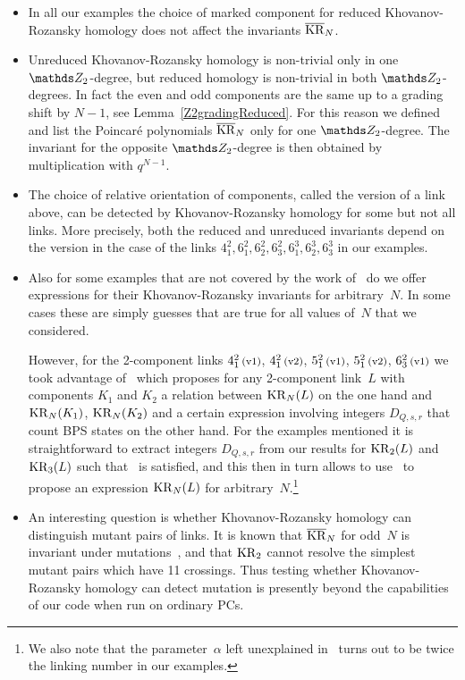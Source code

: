 \documentclass{compositio}
\theoremstyle{definition}
\numberwithin{equation}{section}
\begin{document}
\begin{itemize}
\item 
In all our examples the choice of marked component for reduced Khovanov-Rozansky homology does not affect the invariants $\overline{\operatorname{KR}}_{N}$. 
\item 
Unreduced Khovanov-Rozansky homology is non-trivial only in one $\nZ_{2}$-degree, but reduced homology is non-trivial in both $\nZ_{2}$-degrees. In fact the even and odd components are the same up to a grading shift by $N-1$, see Lemma~\ref{Z2gradingReduced}. For this reason we defined and list the Poincar\'e polynomials $\overline{\operatorname{KR}}_{N}$ only for one $\nZ_{2}$-degree. The invariant for the opposite $\nZ_{2}$-degree is then obtained by multiplication with $q^{N-1}$. 
\item 
The choice of relative orientation of components, called the version of a link above, can be detected by Khovanov-Rozansky homology for some but not all links. More precisely, both the reduced and unreduced invariants depend on the version in the case of the links $4_{1}^2, 6_{1}^2, 6_{2}^2, 6_{3}^2, 6_{1}^3, 6_{2}^3, 6_{3}^3$ in our examples. 
\item 
Also for some examples that are not covered by the work of~\cite{r0508510, r0607544} do we offer expressions for their Khovanov-Rozansky invariants for arbitrary~$N$. In some cases these are simply guesses that are true for all values of~$N$ that we considered. 

However, for the 2-component links $4_{1}^2\,\text{{\footnotesize (v1)}}$, $4_{1}^2\,\text{{\footnotesize (v2)}}$, $5_{1}^2\,\text{{\footnotesize (v1)}}$, $5_{1}^2\,\text{{\footnotesize (v2)}}$, $6_{3}^2\,\text{{\footnotesize (v1)}}$ we took advantage of~\cite[Eq.\,(5.5)]{gsv0412243} which proposes for any 2-component link~$L$ with components $K_{1}$ and $K_{2}$ a relation between $\operatorname{KR}_{N}(L)$ on the one hand and $\operatorname{KR}_N(K_{1})$, $\operatorname{KR}_N(K_{2})$ and a certain expression involving integers $D_{Q,s,r}$ that count BPS states on the other hand. For the examples mentioned it is straightforward to extract integers $D_{Q,s,r}$ from our results for $\operatorname{KR}_{2}(L)$ and $\operatorname{KR}_{3}(L)$ such that~\cite[Eq.\,(5.5)]{gsv0412243} is satisfied, and this then in turn allows to use~\cite[Eq.\,(5.5)]{gsv0412243} to propose an expression $\operatorname{KR}_{N}(L)$ for arbitrary~$N$.\footnote{We also note that the parameter~$\alpha$ left unexplained in~\cite{gsv0412243} turns out to be twice the linking number in our examples.}
\item 
An interesting question is whether Khovanov-Rozansky homology can distinguish mutant pairs of links. It is known that $\overline{\operatorname{KR}}_{N}$ for odd~$N$ is invariant under mutations~\cite{j1101.3302}, and that $\operatorname{KR}_{2}$ cannot resolve the simplest mutant pairs which have 11 crossings. Thus testing whether Khovanov-Rozansky homology can detect mutation is presently beyond the capabilities of our code when run on ordinary PCs. 
\end{itemize}
\end{document}
